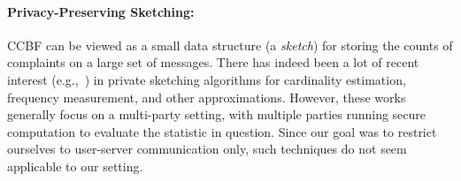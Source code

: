 \paragraph{Privacy-Preserving Sketching:}
CCBF can be viewed as a small data structure (a \emph{sketch}) for storing the counts of complaints on a large set of messages.  There has indeed been a lot of recent interest (e.g.,~\cite{PoPETS:CDKY20, CCS:WJSYG19, NDSS:MelDanDec16, CCS:JanJoh16, CCS:FMJS17, AM14, FGJ+15}) in private sketching algorithms for cardinality estimation, frequency measurement, and other approximations.  However, these works generally focus on a multi-party setting, with multiple parties running secure computation to evaluate the statistic in question.  Since our goal was to restrict ourselves to user-server communication only, such techniques do not seem applicable to our setting.